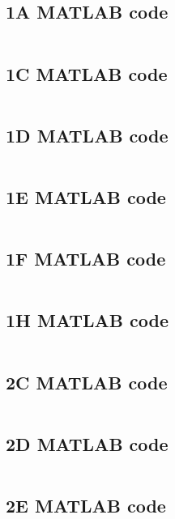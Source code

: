 
\subsection{1A MATLAB code}
\label{apx:1A_matlab}
\inputminted[breaklines]{Matlab}{./Code/Task1A.m}

\subsection{1C MATLAB code}
\label{apx:1C_matlab}
\inputminted[breaklines]{Matlab}{./Code/Task1C.m}

\subsection{1D MATLAB code}
\label{apx:1D_matlab}
\inputminted[breaklines]{Matlab}{./Code/Task1D.m}

\subsection{1E MATLAB code}
\label{apx:1E_matlab}
\inputminted[breaklines]{Matlab}{./Code/Task1E.m}


\subsection{1F MATLAB code}
\label{apx:1F_matlab}
\inputminted[breaklines]{Matlab}{./Code/Task1F.m}


\subsection{1H MATLAB code}
\label{apx:1H_matlab}
\inputminted[breaklines]{Matlab}{./Code/Task1H.m}

\subsection{2C MATLAB code}
\label{apx:2C_matlab}
\inputminted[breaklines]{Matlab}{./Code/Task2C.m}

\subsection{2D MATLAB code}
\label{apx:2D_matlab}
\inputminted[breaklines]{Matlab}{./Code/Task2D.m}

\subsection{2E MATLAB code}
\label{apx:2E_matlab}
\inputminted[breaklines]{Matlab}{./Code/Task2E.m}

